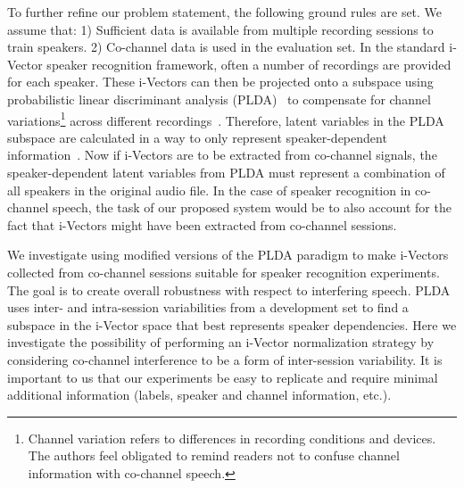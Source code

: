 To further refine our problem statement, the following ground rules are set. We assume that: 1) Sufficient data is available from multiple recording sessions to train speakers. 
2) Co-channel data is used in the evaluation set. In the standard i-Vector speaker recognition framework, often a number of recordings are provided for each speaker. 
These i-Vectors can then be projected onto a subspace using probabilistic linear discriminant analysis (PLDA)~\cite{prince_plda} to compensate for channel variations\footnote{Channel variation refers to differences in recording conditions and devices. The authors feel obligated to remind readers not to confuse channel information with co-channel speech.} across different recordings~\cite{kenny_plda,Daniel2011is}. 
Therefore, latent variables in the PLDA subspace are calculated in a way to only represent speaker-dependent information~\cite{kenny_plda2,cumani_icassp13,burget_icassp11,yun_icassp12}.
Now if i-Vectors are to be extracted from co-channel signals, the speaker-dependent latent variables from PLDA must represent a combination of all speakers in the original audio file. 
In the case of speaker recognition in co-channel speech, the task of our proposed system would be to also account for the fact that i-Vectors might have been extracted from co-channel sessions. 

We investigate using modified versions of the PLDA paradigm to make i-Vectors collected from co-channel sessions suitable for speaker recognition experiments. The goal is to create overall robustness with respect to interfering speech. 
PLDA uses inter- and intra-session variabilities from a development set to find a subspace in the i-Vector space that best represents speaker dependencies. 
Here we investigate the possibility of performing an i-Vector normalization strategy by considering co-channel interference to be a form of inter-session variability.  
It is important to us that our experiments be easy to replicate and require minimal additional information (labels, speaker and channel information, etc.). 

